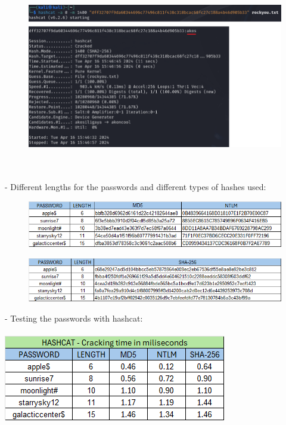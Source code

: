 \documentclass[10pt,oneside,english,a4paper]{article}
\begin{document}
\begin{figure}[h]
	\centering
	\includegraphics[scale = 0.70]{test_hashcat_akos.png}
\end{figure}\\\\

- Different lengths for the passwords and different types of hashes used:\\
\begin{figure}[ht]
	\centering
	\includegraphics[scale = 0.60]{diff_md5_ntlm.png}
\end{figure}
\begin{figure}[ht]
	\centering
	\includegraphics[scale = 0.60]{diff_sha.png}
\end{figure}

- Testing the passwords with hashcat:\\\\
\includegraphics[scale = 0.70]{diff_hashcat.png}\\
\end{document}
